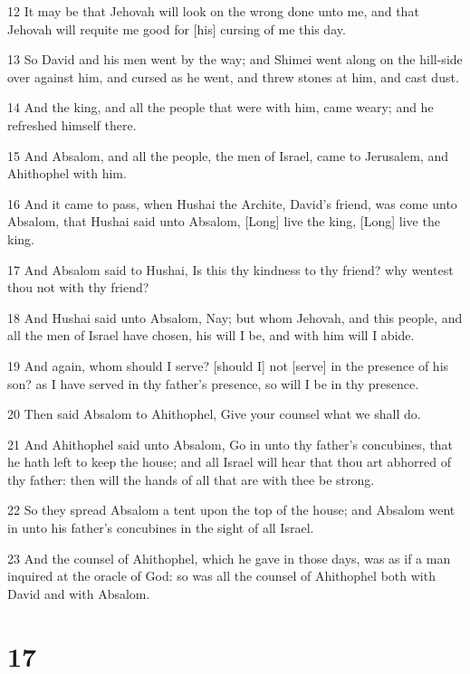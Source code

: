 \par 12 It may be that Jehovah will look on the wrong done unto me, and that Jehovah will requite me good for [his] cursing of me this day.
\par 13 So David and his men went by the way; and Shimei went along on the hill-side over against him, and cursed as he went, and threw stones at him, and cast dust.
\par 14 And the king, and all the people that were with him, came weary; and he refreshed himself there.
\par 15 And Absalom, and all the people, the men of Israel, came to Jerusalem, and Ahithophel with him.
\par 16 And it came to pass, when Hushai the Archite, David's friend, was come unto Absalom, that Hushai said unto Absalom, [Long] live the king, [Long] live the king.
\par 17 And Absalom said to Hushai, Is this thy kindness to thy friend? why wentest thou not with thy friend?
\par 18 And Hushai said unto Absalom, Nay; but whom Jehovah, and this people, and all the men of Israel have chosen, his will I be, and with him will I abide.
\par 19 And again, whom should I serve? [should I] not [serve] in the presence of his son? as I have served in thy father's presence, so will I be in thy presence.
\par 20 Then said Absalom to Ahithophel, Give your counsel what we shall do.
\par 21 And Ahithophel said unto Absalom, Go in unto thy father's concubines, that he hath left to keep the house; and all Israel will hear that thou art abhorred of thy father: then will the hands of all that are with thee be strong.
\par 22 So they spread Absalom a tent upon the top of the house; and Absalom went in unto his father's concubines in the sight of all Israel.
\par 23 And the counsel of Ahithophel, which he gave in those days, was as if a man inquired at the oracle of God: so was all the counsel of Ahithophel both with David and with Absalom.

\chapter{17}

